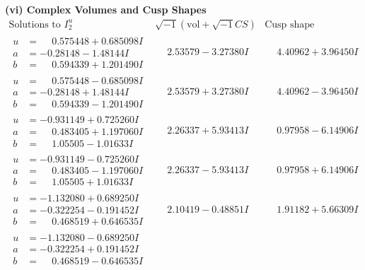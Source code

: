 \documentclass[1p]{elsarticle_modified}
\theoremstyle{definition}
\newcommand{\I}{\sqrt{-1}}
\begin{document}
\newpage\flushleft \textbf{(vi) Complex Volumes and Cusp Shapes}
$$\begin{array}{c|c|c}  
\text{Solutions to }I^u_{2}& \I (\text{vol} + \sqrt{-1}CS) & \text{Cusp shape}\\
 \hline 
\begin{aligned}
u &= \phantom{-}0.575448 + 0.685098 I \\
a &= -0.28148 - 1.48144 I \\
b &= \phantom{-}0.594339 + 1.201490 I\end{aligned}
 & \phantom{-}2.53579 - 3.27380 I & \phantom{-}4.40962 + 3.96450 I \\ \hline\begin{aligned}
u &= \phantom{-}0.575448 - 0.685098 I \\
a &= -0.28148 + 1.48144 I \\
b &= \phantom{-}0.594339 - 1.201490 I\end{aligned}
 & \phantom{-}2.53579 + 3.27380 I & \phantom{-}4.40962 - 3.96450 I \\ \hline\begin{aligned}
u &= -0.931149 + 0.725260 I \\
a &= \phantom{-}0.483405 + 1.197060 I \\
b &= \phantom{-}1.05505 - 1.01633 I\end{aligned}
 & \phantom{-}2.26337 + 5.93413 I & \phantom{-}0.97958 - 6.14906 I \\ \hline\begin{aligned}
u &= -0.931149 - 0.725260 I \\
a &= \phantom{-}0.483405 - 1.197060 I \\
b &= \phantom{-}1.05505 + 1.01633 I\end{aligned}
 & \phantom{-}2.26337 - 5.93413 I & \phantom{-}0.97958 + 6.14906 I \\ \hline\begin{aligned}
u &= -1.132080 + 0.689250 I \\
a &= -0.322254 - 0.191452 I \\
b &= \phantom{-}0.468519 + 0.646535 I\end{aligned}
 & \phantom{-}2.10419 - 0.48851 I & \phantom{-}1.91182 + 5.66309 I \\ \hline\begin{aligned}
u &= -1.132080 - 0.689250 I \\
a &= -0.322254 + 0.191452 I \\
b &= \phantom{-}0.468519 - 0.646535 I\end{aligned}

\end{array}$$
\end{document}
